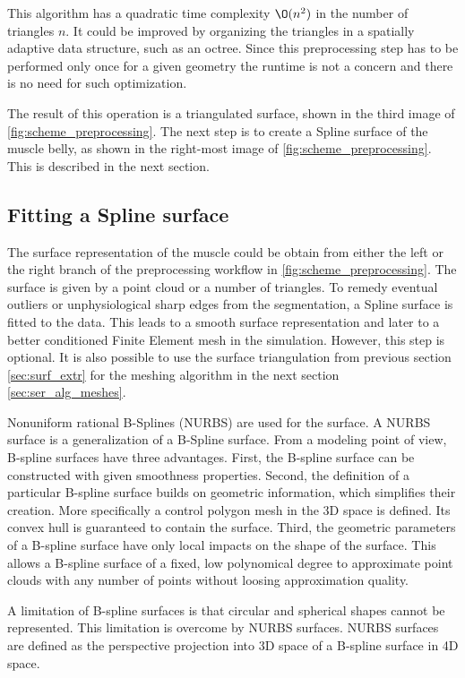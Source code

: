 This algorithm has a quadratic time complexity $\O(n^2)$ in the number of triangles $n$. It could be improved by organizing the triangles in a spatially adaptive data structure, such as an octree. Since this preprocessing step has to be performed only once for a given geometry the runtime is not a concern and there is no need for such optimization.

The result of this operation is a triangulated surface, shown in the third image of \cref{fig:scheme_preprocessing}. The next step is to create a Spline surface of the muscle belly, as shown in the right-most image of \cref{fig:scheme_preprocessing}. This is described in the next section.

\subsection{Fitting a Spline surface}\label{sec:nurbs}
The surface representation of the muscle could be obtain from either the left or the right branch of the preprocessing workflow in \cref{fig:scheme_preprocessing}. The surface is given by a point cloud or a number of triangles. To remedy eventual outliers or unphysiological sharp edges from the segmentation, a Spline surface is fitted to the data. This leads to a smooth surface representation and later to a better conditioned Finite Element mesh in the simulation. However, this step is optional. It is also possible to use the surface triangulation from previous section \ref{sec:surf_extr} for the meshing algorithm in the next section \ref{sec:ser_alg_meshes}.

Nonuniform rational B-Splines (NURBS) are used for the surface. A NURBS surface is a generalization of a B-Spline surface. From a modeling point of view, B-spline surfaces have three advantages. First, the B-spline surface can be constructed with given smoothness properties.  Second, the definition of a particular B-spline surface builds on geometric information, which simplifies their creation. More specifically a control polygon mesh in the 3D space is defined. Its convex hull is guaranteed to contain the surface. Third, the geometric parameters of a B-spline surface have only local impacts on the shape of the surface. This allows a B-spline surface of a fixed, low polynomical degree to approximate point clouds with any number of points without loosing approximation quality.

A limitation of B-spline surfaces is that circular and spherical shapes cannot be represented. This limitation is overcome by NURBS surfaces. NURBS surfaces are defined as the perspective projection into 3D space of a B-spline surface in 4D space.

